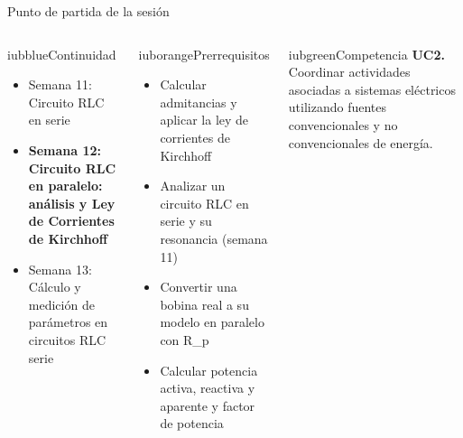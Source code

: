 \documentclass[aspectratio=169,11pt,xcolor={table}]{beamer}
\begin{document}
\begin{frame}{Punto de partida de la sesión}
\begin{columns}[T,onlytextwidth]
\begin{caja}[height=5.9cm]{iubblue}{Continuidad}
\scriptsize \begin{itemize}\setlength{\itemsep}{2pt}
  \item Semana 11: Circuito RLC en serie
  \item \textbf{Semana 12: Circuito RLC en paralelo: análisis y Ley de Corrientes de Kirchhoff}
  \item Semana 13: Cálculo y medición de parámetros en circuitos RLC serie
\end{itemize}
\end{caja}
\begin{caja}[height=5.9cm]{iuborange}{Prerrequisitos}
\scriptsize \begin{itemize}\setlength{\itemsep}{2pt}
  \item Calcular admitancias y aplicar la ley de corrientes de Kirchhoff
  \item Analizar un circuito RLC en serie y su resonancia (semana 11)
  \item Convertir una bobina real a su modelo en paralelo con R\_p
  \item Calcular potencia activa, reactiva y aparente y factor de potencia
\end{itemize}
\end{caja}
\begin{caja}[height=5.9cm]{iubgreen}{Competencia}
\scriptsize \textbf{UC2.} Coordinar actividades asociadas a sistemas eléctricos utilizando fuentes convencionales y no convencionales de energía.
\end{caja}
\end{columns}
\end{frame}
\end{document}
